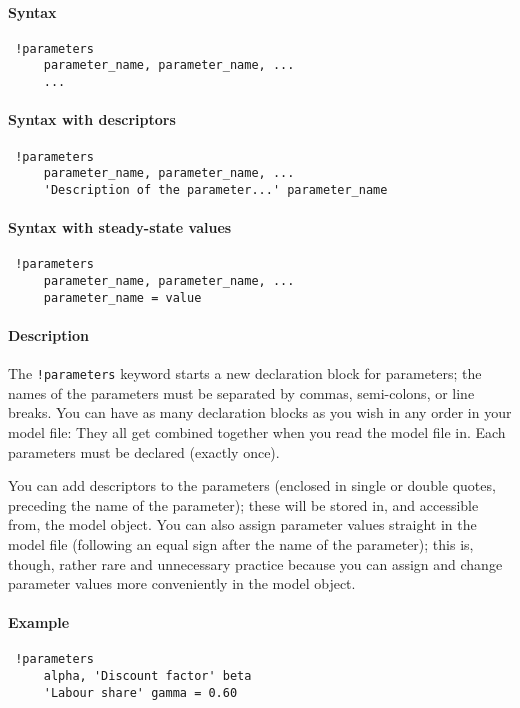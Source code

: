 


	\paragraph{Syntax}
 
 \begin{verbatim}
 !parameters
     parameter_name, parameter_name, ...
     ...
 \end{verbatim}
 
 \paragraph{Syntax with descriptors}
 
 \begin{verbatim}
 !parameters
     parameter_name, parameter_name, ...
     'Description of the parameter...' parameter_name
 \end{verbatim}
 
 \paragraph{Syntax with steady-state values}
 
 \begin{verbatim}
 !parameters
     parameter_name, parameter_name, ...
     parameter_name = value
 \end{verbatim}
 
 \paragraph{Description}
 
 The \texttt{!parameters} keyword starts a new declaration block for
 parameters; the names of the parameters must be separated by commas,
 semi-colons, or line breaks. You can have as many declaration blocks as
 you wish in any order in your model file: They all get combined together
 when you read the model file in. Each parameters must be declared
 (exactly once).
 
 You can add descriptors to the parameters (enclosed in single or double
 quotes, preceding the name of the parameter); these will be stored in,
 and accessible from, the model object. You can also assign parameter
 values straight in the model file (following an equal sign after the
 name of the parameter); this is, though, rather rare and unnecessary
 practice because you can assign and change parameter values more
 conveniently in the model object.
 
 \paragraph{Example}
 
 \begin{verbatim}
 !parameters
     alpha, 'Discount factor' beta
     'Labour share' gamma = 0.60
 \end{verbatim}


